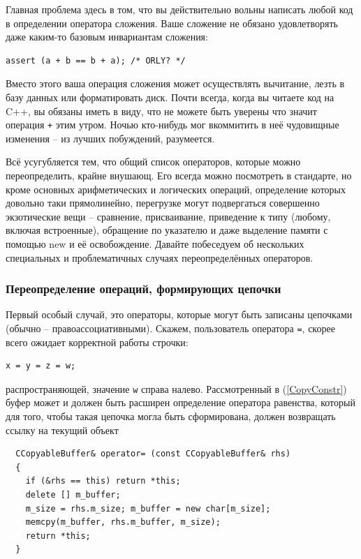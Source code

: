 \documentclass[a4paper,12pt,oneside]{article}
\begin{document}
Главная проблема здесь в том, что вы действительно вольны написать любой код в определении оператора сложения. Ваше сложение не обязано удовлетворять даже каким-то базовым инвариантам сложения:

\begin{lstlisting}
assert (a + b == b + a); /* ORLY? */
\end{lstlisting}

Вместо этого ваша операция сложения может осуществлять вычитание, лезть в базу данных или форматировать диск. Почти всегда, когда вы читаете код на C++, вы обязаны иметь в виду, что не можете быть уверены что значит операция \lstinline!+! этим утром. Ночью кто-нибудь мог вкоммитить в неё чудовищные изменения – из лучших побуждений, разумеется.

Всё усугубляется тем, что общий список операторов, которые можно переопределить, крайне внушающ. Его всегда можно посмотреть в стандарте, но кроме основных арифметических и логических операций, определение которых довольно таки прямолинейно, перегрузке могут подвергаться совершенно экзотические вещи – сравнение, присваивание, приведение к типу (любому, включая встроенные), обращение по указателю и даже выделение памяти с помощью new и её освобождение. Давайте побеседуем об нескольких специальных и проблематичных случаях переопределённых операторов.

\subsubsection{Переопределение операций, формирующих цепочки}\label{ChainOps}

Первый особый случай, это операторы, которые могут быть записаны цепочками (обычно -- правоассоциативными). Скажем, пользователь оператора \lstinline!=!, скорее всего ожидает корректной работы строчки:

\begin{lstlisting}
x = y = z = w;
\end{lstlisting}

распространяющей, значение \lstinline!w! справа налево. Рассмотренный в (\ref{CopyConstr}) буфер может и должен быть расширен определение оператора равенства, который для того, чтобы такая цепочка могла быть сформирована, должен возвращать ссылку на текущий объект

\begin{lstlisting}
  CCopyableBuffer& operator= (const CCopyableBuffer& rhs)
  {
    if (&rhs == this) return *this;
    delete [] m_buffer;
    m_size = rhs.m_size; m_buffer = new char[m_size];
    memcpy(m_buffer, rhs.m_buffer, m_size);
    return *this;
  }
\end{lstlisting}
\end{document}
